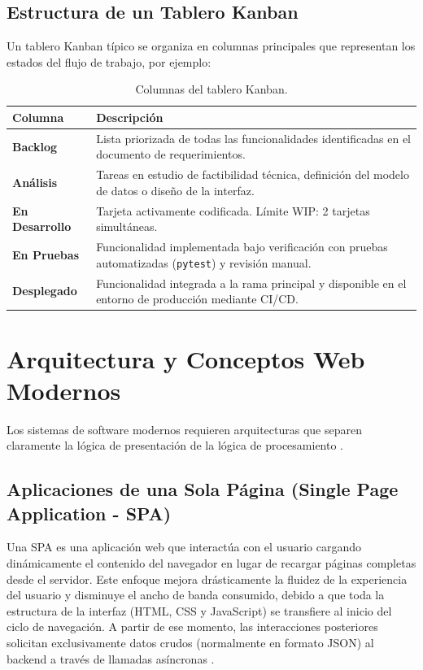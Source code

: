 \subsection{Estructura de un Tablero Kanban}

Un tablero Kanban típico se organiza en columnas principales que representan los estados del flujo de trabajo, por ejemplo:

\begin{table}[H]
\centering
\begin{tabular}{|l|p{9cm}|}
\hline
\textbf{Columna} & \textbf{Descripción} \\
\hline
\textbf{Backlog} & Lista priorizada de todas las funcionalidades identificadas en el documento de requerimientos. \\
\hline
\textbf{Análisis} & Tareas en estudio de factibilidad técnica, definición del modelo de datos o diseño de la interfaz. \\
\hline
\textbf{En Desarrollo} & Tarjeta activamente codificada. Límite WIP: 2 tarjetas simultáneas. \\
\hline
\textbf{En Pruebas} & Funcionalidad implementada bajo verificación con pruebas automatizadas (\texttt{pytest}) y revisión manual. \\
\hline
\textbf{Desplegado} & Funcionalidad integrada a la rama principal y disponible en el entorno de producción mediante CI/CD. \\
\hline
\end{tabular}
\caption{Columnas del tablero Kanban.}
\end{table}

\section{Arquitectura y Conceptos Web Modernos}

Los sistemas de software modernos requieren arquitecturas que separen claramente la lógica de presentación de la lógica de procesamiento \cite{fowler2002}. 

\subsection{Aplicaciones de una Sola Página (Single Page Application - SPA)}
Una SPA es una aplicación web que interactúa con el usuario cargando dinámicamente el contenido del navegador en lugar de recargar páginas completas desde el servidor. Este enfoque mejora drásticamente la fluidez de la experiencia del usuario y disminuye el ancho de banda consumido, debido a que toda la estructura de la interfaz (HTML, CSS y JavaScript) se transfiere al inicio del ciclo de navegación. A partir de ese momento, las interacciones posteriores solicitan exclusivamente datos crudos (normalmente en formato JSON) al backend a través de llamadas asíncronas \cite{sommerville2016}.

